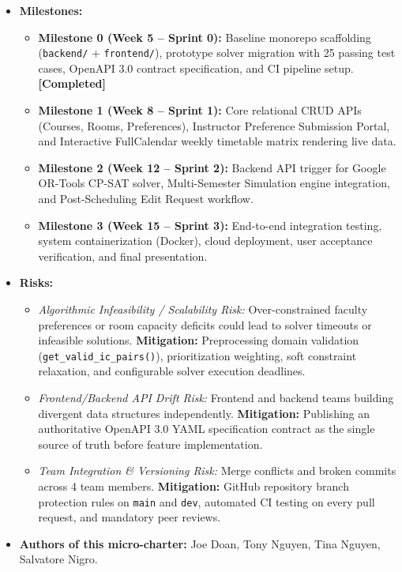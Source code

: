 \documentclass[11pt,letterpaper]{article}
\begin{document}
\begin{itemize}[leftmargin=1.5em, itemsep=5pt, topsep=4pt]
    \item \textbf{Milestones:}
    \begin{itemize}[itemsep=3pt, topsep=2pt]
        \item \textbf{Milestone 0 (Week 5 -- Sprint 0):} Baseline monorepo scaffolding (\texttt{backend/} + \texttt{frontend/}), prototype solver migration with 25 passing test cases, OpenAPI 3.0 contract specification, and CI pipeline setup. \textbf{\color{statusgreen}[Completed]}
        \item \textbf{Milestone 1 (Week 8 -- Sprint 1):} Core relational CRUD APIs (Courses, Rooms, Preferences), Instructor Preference Submission Portal, and Interactive FullCalendar weekly timetable matrix rendering live data.
        \item \textbf{Milestone 2 (Week 12 -- Sprint 2):} Backend API trigger for Google OR-Tools CP-SAT solver, Multi-Semester Simulation engine integration, and Post-Scheduling Edit Request workflow.
        \item \textbf{Milestone 3 (Week 15 -- Sprint 3):} End-to-end integration testing, system containerization (Docker), cloud deployment, user acceptance verification, and final presentation.
    \end{itemize}
    
    \item \textbf{Risks:}
    \begin{itemize}[itemsep=3pt, topsep=2pt]
        \item \textit{Algorithmic Infeasibility / Scalability Risk:} Over-constrained faculty preferences or room capacity deficits could lead to solver timeouts or infeasible solutions. \textbf{Mitigation:} Preprocessing domain validation (\texttt{get\_valid\_ic\_pairs()}), prioritization weighting, soft constraint relaxation, and configurable solver execution deadlines.
        \item \textit{Frontend/Backend API Drift Risk:} Frontend and backend teams building divergent data structures independently. \textbf{Mitigation:} Publishing an authoritative OpenAPI 3.0 YAML specification contract as the single source of truth before feature implementation.
        \item \textit{Team Integration \& Versioning Risk:} Merge conflicts and broken commits across 4 team members. \textbf{Mitigation:} GitHub repository branch protection rules on \texttt{main} and \texttt{dev}, automated CI testing on every pull request, and mandatory peer reviews.
    \end{itemize}
    
    \item \textbf{Authors of this micro-charter:} Joe Doan, Tony Nguyen, Tina Nguyen, Salvatore Nigro.
\end{itemize}
\end{document}
